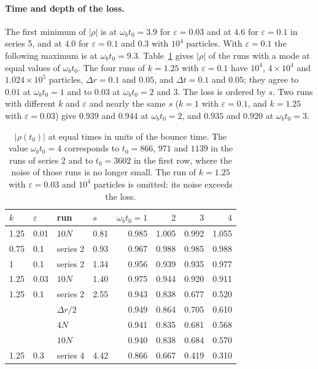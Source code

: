 \documentclass[11pt,a4paper]{article}
\begin{document}
\paragraph{Time and depth of the loss.} The first minimum of $|\rho|$ is at $\omega_bt_0=3.9$ for
$\varepsilon=0.03$ and at $4.6$ for $\varepsilon=0.1$ in series 5, and at $4.0$ for $\varepsilon=0.1$ and
$0.3$ with $10^4$ particles. With $\varepsilon=0.1$ the following maximum is at $\omega_bt_0=9.3$.
Table~\ref{tab:perdida} gives $|\rho|$ of the runs with a mode at equal values of $\omega_bt_0$.
The four runs of $k=1.25$ with $\varepsilon=0.1$ have $10^4$, $4\times10^4$ and $1.024\times10^5$
particles, $\Delta r=0.1$ and $0.05$, and $\Delta t=0.1$ and $0.05$; they agree to $0.01$ at
$\omega_bt_0=1$ and to $0.03$ at $\omega_bt_0=2$ and $3$. The loss is ordered by $s$. Two runs with
different $k$ and $\varepsilon$ and nearly the same $s$ ($k=1$ with $\varepsilon=0.1$, and $k=1.25$ with
$\varepsilon=0.03$) give $0.939$ and $0.944$ at $\omega_bt_0=2$, and $0.935$ and $0.920$ at
$\omega_bt_0=3$.

\begin{table}[!htbp]
\centering
\small
\begin{tabular}{llllrrrr}
\toprule
$k$ & $\varepsilon$ & run & $s$ & $\omega_bt_0=1$ & $2$ & $3$ & $4$\\
\midrule
1.25 & 0.01 & $10N$ & 0.81 & 0.985 & 1.005 & 0.992 & 1.055\\
0.75 & 0.1 & series 2 & 0.93 & 0.967 & 0.988 & 0.985 & 0.988\\
1 & 0.1 & series 2 & 1.34 & 0.956 & 0.939 & 0.935 & 0.977\\
1.25 & 0.03 & $10N$ & 1.40 & 0.975 & 0.944 & 0.920 & 0.911\\
1.25 & 0.1 & series 2 & 2.55 & 0.943 & 0.838 & 0.677 & 0.520\\
 & & $\Delta r/2$ & & 0.949 & 0.864 & 0.705 & 0.610\\
 & & $4N$ & & 0.941 & 0.835 & 0.681 & 0.568\\
 & & $10N$ & & 0.940 & 0.838 & 0.684 & 0.570\\
1.25 & 0.3 & series 4 & 4.42 & 0.866 & 0.667 & 0.419 & 0.310\\
\bottomrule
\end{tabular}
\caption{$|\rho(t_0)|$ at equal times in units of the bounce time. The value $\omega_bt_0=4$
corresponds to $t_0=866$, $971$ and $1139$ in the runs of series 2 and to $t_0=3602$ in the first
row, where the noise of those runs is no longer small. The run of $k=1.25$ with $\varepsilon=0.03$
and $10^4$ particles is omitted: its noise exceeds the loss.}
\label{tab:perdida}
\end{table}
\end{document}
